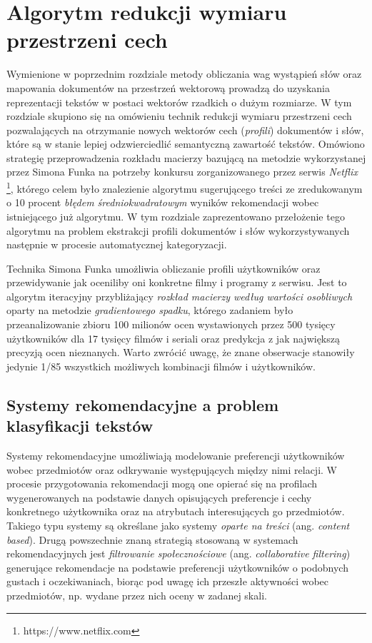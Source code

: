 \documentclass{pracamgr}
\begin{document}
\chapter{Algorytm redukcji wymiaru przestrzeni cech}

Wymienione w poprzednim rozdziale metody obliczania wag wystąpień słów oraz mapowania dokumentów na przestrzeń wektorową prowadzą do uzyskania reprezentacji tekstów w postaci wektorów rzadkich o dużym rozmiarze. W tym rozdziale skupiono się na omówieniu technik redukcji wymiaru przestrzeni cech pozwalających na otrzymanie nowych wektorów cech (\textit{profili}) dokumentów i słów, które są w stanie lepiej odzwierciedlić semantyczną zawartość tekstów. Omówiono strategię przeprowadzenia rozkładu macierzy bazującą na metodzie wykorzystanej przez Simona Funka \cite{funk} na potrzeby konkursu zorganizowanego przez serwis \textit{Netflix} \footnote{https://www.netflix.com}, którego celem było znalezienie algorytmu sugerującego treści ze zredukowanym o 10 procent \textit{błędem średniokwadratowym} wyników rekomendacji wobec istniejącego już algorytmu. W tym rozdziale zaprezentowano przełożenie tego algorytmu na problem ekstrakcji profili dokumentów i słów wykorzystywanych następnie w procesie automatycznej kategoryzacji. 

Technika Simona Funka umożliwia obliczanie profili użytkowników oraz przewidywanie jak oceniliby oni konkretne filmy i programy z serwisu. Jest to algorytm iteracyjny przybliżający \textit{rozkład macierzy według wartości osobliwych} oparty na metodzie \textit{gradientowego spadku}, którego zadaniem było przeanalizowanie zbioru 100 milionów ocen wystawionych przez 500 tysięcy użytkowników dla 17 tysięcy filmów i seriali oraz predykcja z jak największą precyzją ocen nieznanych. Warto zwrócić uwagę, że znane obserwacje stanowiły jedynie 1/85 wszystkich możliwych kombinacji filmów i użytkowników.

\section{Systemy rekomendacyjne a problem klasyfikacji tekstów}

Systemy rekomendacyjne umożliwiają modelowanie preferencji użytkowników wobec przedmiotów oraz odkrywanie występujących między nimi relacji. W procesie przygotowania rekomendacji mogą one opierać się na profilach wygenerowanych na podstawie danych opisujących preferencje i cechy konkretnego użytkownika oraz na atrybutach interesujących go przedmiotów. Takiego typu systemy są określane jako systemy \textit{oparte na treści} (ang. \textit{content based}). Drugą powszechnie znaną strategią stosowaną w systemach rekomendacyjnych jest \textit{filtrowanie społecznościowe} (ang. \textit{collaborative filtering}) generujące rekomendacje na podstawie preferencji użytkowników o podobnych gustach i oczekiwaniach, biorąc pod uwagę ich przeszłe aktywności wobec przedmiotów, np. wydane przez nich oceny w zadanej skali.
\end{document}
